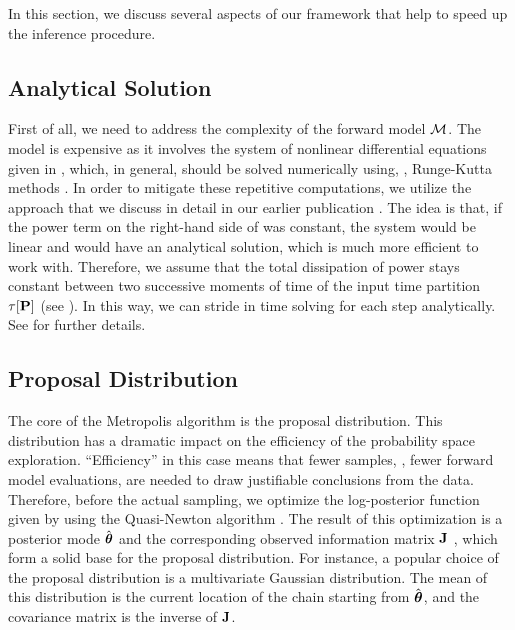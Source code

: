 In this section, we discuss several aspects of our framework that help to speed up the inference procedure.

\subsection{Analytical Solution} 
First of all, we need to address the complexity of the forward model $\model$. The model is expensive as it involves the system of nonlinear differential equations given in , which, in general, should be solved numerically using, \eg, Runge-Kutta methods \cite{press2007}. In order to mitigate these repetitive computations, we utilize the approach that we discuss in detail in our earlier publication \cite{ukhov2012}. The idea is that, if the power term on the right-hand side of  was constant, the system would be linear and would have an analytical solution, which is much more efficient to work with. Therefore, we assume that the total dissipation of power stays constant between two successive moments of time of the input time partition $\tau[\mathbf{P}]$ (see ). In this way, we can stride in time solving  for each step analytically. See \cite{ukhov2012} for further details.

\subsection{Proposal Distribution} 
The core of the Metropolis algorithm is the proposal distribution. This distribution has a dramatic impact on the efficiency of the probability space exploration. ``Efficiency'' in this case means that fewer samples, \ie, fewer forward model evaluations, are needed to draw justifiable conclusions from the data. Therefore, before the actual sampling, we optimize the log-posterior function given by  using the Quasi-Newton algorithm \cite{press2007}. The result of this optimization is a posterior mode $\hat{{\boldsymbol\theta}}$ and the corresponding observed information matrix $\mathbf{J}$ \cite{gelman2004}, which form a solid base for the proposal distribution. For instance, a popular choice of the proposal distribution is a multivariate Gaussian distribution. The mean of this distribution is the current location of the chain starting from $\hat{{\boldsymbol\theta}}$, and the covariance matrix is the inverse of $\mathbf{J}$.

